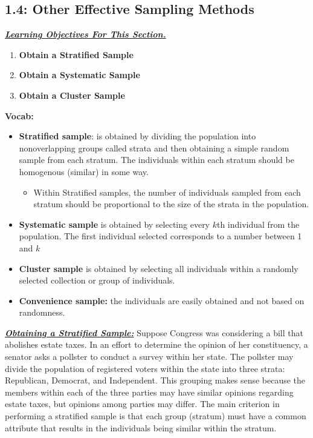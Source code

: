\documentclass{report}
\begin{document}
        \subsection{1.4: Other Effective Sampling Methods}
        \bigbreak \noindent 
        \textbf{\textit{\underline{Learning Objectives For This Section.}}}
        \begin{enumerate}
            \item \textbf{Obtain a Stratified Sample}
            \item \textbf{Obtain a Systematic Sample}
            \item \textbf{Obtain a Cluster Sample}
        \end{enumerate}
        \bigbreak \noindent 
        \textbf{Vocab:}
        \begin{itemize}
            \item \textbf{Stratified sample}: is obtained by dividing the population into nonoverlapping groups called strata and then obtaining a simple random sample from each stratum. The individuals within each stratum should be homogenous (similar) in some way.
                \begin{itemize}
                    \item Within Stratified samples, the number of individuals sampled from each stratum should be proportional to the size of the strata in the population.
                \end{itemize}
            \item \textbf{Systematic sample} is obtained by selecting every $k$th individual from the population. The first individual selected corresponds to a number between 1 and $k$
            \item \textbf{Cluster sample} is obtained by selecting all individuals within a randomly selected collection or group of individuals.
            \item \textbf{Convenience sample:} the individuals are easily obtained and not based on randomness.
        \end{itemize}
        \bigbreak \noindent 
        \textbf{\textit{\underline{Obtaining a Stratified Sample:}}}
        \bigbreak \noindent 
        Suppose Congress was considering a bill that abolishes estate taxes. In an effort to determine the opinion of her constituency, a senator asks a pollster to conduct a survey within her state.
        \bigbreak \noindent 
        The pollster may divide the population of registered voters within the state into three strata: Republican, Democrat, and Independent. This grouping makes sense because the members within each of the three parties may have similar opinions regarding estate taxes, but opinions among parties may differ. The main criterion in performing a stratified sample is that each group (stratum) must have a common attribute that results in the individuals being similar within the stratum.
\end{document}
